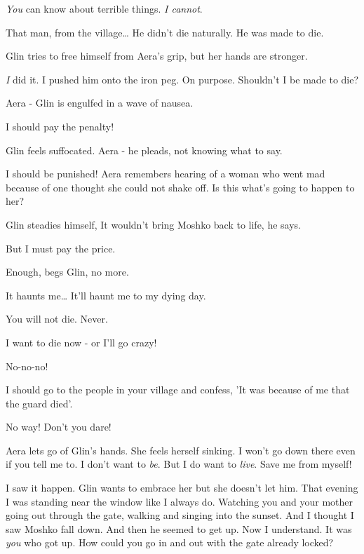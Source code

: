 \documentclass[letterpaper]{article}
\begin{document}
{\textquotedbl}\textit{You} can know about terrible things. \textit{I cannot}.{\textquotedbl} 

{\textquotedbl}That man, from the village{\dots} He didn't die naturally. He was made to die.{\textquotedbl} 

Glin tries to free himself from Aera's grip, but her hands are stronger. 

{\textquotedbl}\textit{I} did it. I pushed him onto the iron peg. On purpose. Shouldn't I be made to die?{\textquotedbl}


{\textquotedbl}Aera -{\textquotedbl} Glin is engulfed in a wave of nausea. 

{\textquotedbl}I should pay the penalty!{\textquotedbl}

Glin feels suffocated. {\textquotedbl}Aera -{\textquotedbl} he pleads, not knowing what to say. 

{\textquotedbl}I should be punished!{\textquotedbl} Aera remembers hearing of a woman who went mad because of one
thought she could not shake off. Is this what's going to happen to her? 

Glin steadies himself, {\textquotedbl}It wouldn't bring Moshko back to life,{\textquotedbl} he says. 

{\textquotedbl}But I must pay the price.{\textquotedbl} 

{\textquotedbl}Enough,{\textquotedbl} begs Glin, {\textquotedbl}no more.{\textquotedbl} 

{\textquotedbl}It haunts me{\dots} It'll haunt me to my dying day.{\textquotedbl} 

{\textquotedbl}You will not die. Never.{\textquotedbl} 

{\textquotedbl}I want to die now - or I'll go crazy!{\textquotedbl} 

{\textquotedbl}No-no-no!{\textquotedbl}~ 

{\textquotedbl}I should go to the people in your village and confess, 'It was because of me that the guard
died'.{\textquotedbl} 

{\textquotedbl}No way! Don't you dare!{\textquotedbl} ~~~~~~~~~~~~~~~~~~~~~~~~~~~~~~~~~~~~~~~~~~~~ 

Aera lets go of Glin's hands. She feels herself sinking. {\textquotedbl}I won't go down there even if you tell me to. I
don't want to \textit{be}. But I do want to \textit{live}. Save me from myself!{\textquotedbl} 

{\textquotedbl}I saw it happen.{\textquotedbl} Glin wants to embrace her but she doesn't let him. {\textquotedbl}That
evening I was standing near the window like I always do. Watching you and your mother going out through the gate,
walking and singing into the sunset. And I thought I saw Moshko fall down. And then he seemed to get up. Now I
understand. It was \textit{you} who got up. How could you go in and out with the gate already locked?{\textquotedbl} 
\end{document}
